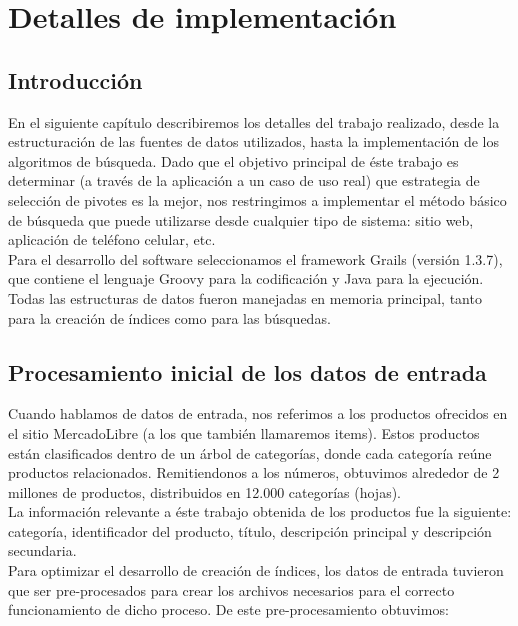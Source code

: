 	\chapter{Detalles de implementaci\'on}

\section{Introducci\'on}

En el siguiente cap\'itulo describiremos los detalles del trabajo realizado, desde la estructuraci\'on de las fuentes de datos utilizados, hasta la implementaci\'on de los algoritmos de b\'usqueda. Dado que el objetivo principal de \'este trabajo es determinar (a trav\'es de la aplicaci\'on a un caso de uso real) que estrategia de selecci\'on de pivotes es la mejor, nos restringimos a implementar el m\'etodo b\'asico de b\'usqueda que puede utilizarse desde cualquier tipo de sistema: sitio web, aplicaci\'on de tel\'efono celular, etc.\\

Para el desarrollo del software seleccionamos el framework Grails (versi\'on 1.3.7), que contiene el lenguaje Groovy para la codificaci\'on y Java para la ejecuci\'on.\\

Todas las estructuras de datos fueron manejadas en memoria principal, tanto para la creaci\'on de \'indices como para las b\'usquedas.


\section{Procesamiento inicial de los datos de entrada} \label{proc-inic}

Cuando hablamos de datos de entrada, nos referimos a los productos ofrecidos en el sitio MercadoLibre (a los que tambi\'en llamaremos items). Estos productos est\'an clasificados dentro de un \'arbol de categor\'ias, donde cada categor\'ia re\'une productos relacionados. Remitiendonos a los n\'umeros, obtuvimos alrededor de 2 millones de productos, distribuidos en 12.000 categor\'ias (hojas).\\

La informaci\'on relevante a \'este trabajo obtenida de los productos fue la siguiente: categor\'ia, identificador del producto, t\'itulo, descripci\'on principal y descripci\'on secundaria.\\

Para optimizar el desarrollo de creaci\'on de \'indices, los datos de entrada tuvieron que ser pre-procesados para crear los archivos necesarios para el correcto funcionamiento de dicho proceso. De este pre-procesamiento obtuvimos:\\

